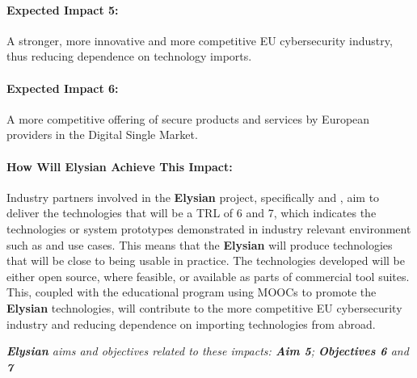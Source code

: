 \documentclass[a4paper,11pt]{article}
\newcommand{\project}[1]{\textbf{#1}\xspace}
\newcommand{\SECURITY}{\project{Elysian}}
\newcommand{\TheProject}{\SECURITY}
\begin{document}
\begin{mdframed}[backgroundcolor=blue!5]
\paragraph{Expected Impact 5:}
A stronger, more innovative and more competitive EU cybersecurity industry, thus reducing dependence on technology imports.

\paragraph{Expected Impact 6:}
A more competitive offering of secure products and services by European providers in the Digital Single Market.
\end{mdframed}

\begin{mdframed}[backgroundcolor=gray!10]
\paragraph{How Will \TheProject{} Achieve This Impact:}
Industry partners involved in the \TheProject{} project, specifically \IBMshort{} and \YAGshort{}, aim to deliver the technologies that will be a TRL of 6 and 7, which indicates the technologies or system prototypes demonstrated in industry relevant environment such as \SOPRAshort{} and \FRQshort{} use cases. This means that the \TheProject{} will produce technologies that will be close to being usable in practice. The technologies developed will be either open source, where feasible, or available as parts of commercial tool suites. This, coupled with the educational program using MOOCs to promote the \TheProject{} technologies, will contribute to the more competitive EU cybersecurity industry and reducing dependence on importing technologies from abroad.

\emph{\TheProject{} aims and objectives related to these impacts: \textbf{Aim 5}; \textbf{Objectives 6} and \textbf{7}}
\end{mdframed}


\end{document}
